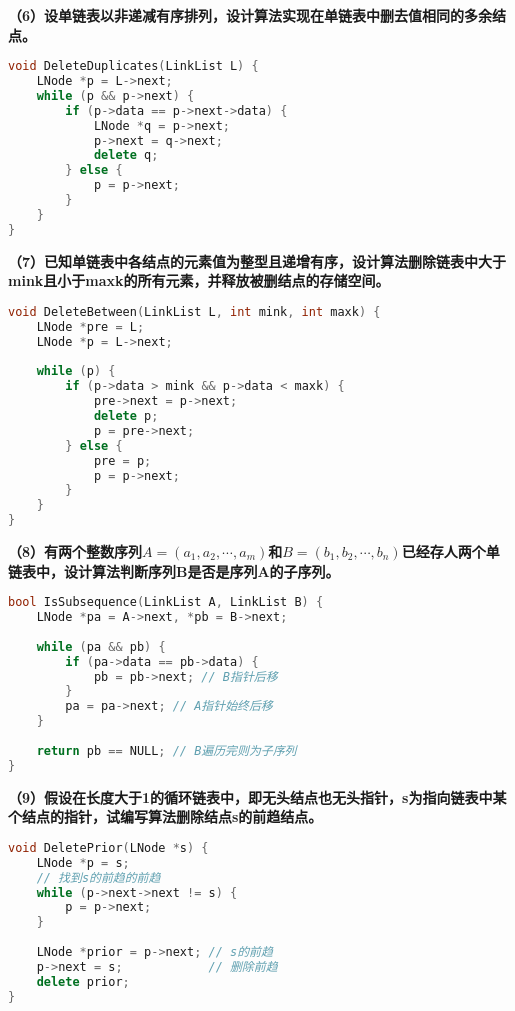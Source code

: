 \documentclass[12pt,a4paper]{amsart}
\begin{document}
\textbf{（6）设单链表以非递减有序排列，设计算法实现在单链表中删去值相同的多余结点。}

\begin{lstlisting}[language=C++]
void DeleteDuplicates(LinkList L) {
    LNode *p = L->next;
    while (p && p->next) {
        if (p->data == p->next->data) {
            LNode *q = p->next;
            p->next = q->next;
            delete q;
        } else {
            p = p->next;
        }
    }
}
\end{lstlisting}

\textbf{（7）已知单链表中各结点的元素值为整型且递增有序，设计算法删除链表中大于mink且小于maxk的所有元素，并释放被删结点的存储空间。}

\begin{lstlisting}[language=C++]
void DeleteBetween(LinkList L, int mink, int maxk) {
    LNode *pre = L;
    LNode *p = L->next;
    
    while (p) {
        if (p->data > mink && p->data < maxk) {
            pre->next = p->next;
            delete p;
            p = pre->next;
        } else {
            pre = p;
            p = p->next;
        }
    }
}
\end{lstlisting}

\textbf{（8）有两个整数序列$A=(a_1, a_2, \cdots, a_m)$和$B=(b_1, b_2, \cdots, b_n)$已经存人两个单链表中，设计算法判断序列B是否是序列A的子序列。}

\begin{lstlisting}[language=C++]
bool IsSubsequence(LinkList A, LinkList B) {
    LNode *pa = A->next, *pb = B->next;
    
    while (pa && pb) {
        if (pa->data == pb->data) {
            pb = pb->next; // B指针后移
        }
        pa = pa->next; // A指针始终后移
    }
    
    return pb == NULL; // B遍历完则为子序列
}
\end{lstlisting}

\textbf{（9）假设在长度大于1的循环链表中，即无头结点也无头指针，s为指向链表中某个结点的指针，试编写算法删除结点s的前趋结点。}

\begin{lstlisting}[language=C++]
void DeletePrior(LNode *s) {
    LNode *p = s;
    // 找到s的前趋的前趋
    while (p->next->next != s) {
        p = p->next;
    }
    
    LNode *prior = p->next; // s的前趋
    p->next = s;            // 删除前趋
    delete prior;
}
\end{lstlisting}
\end{document}
